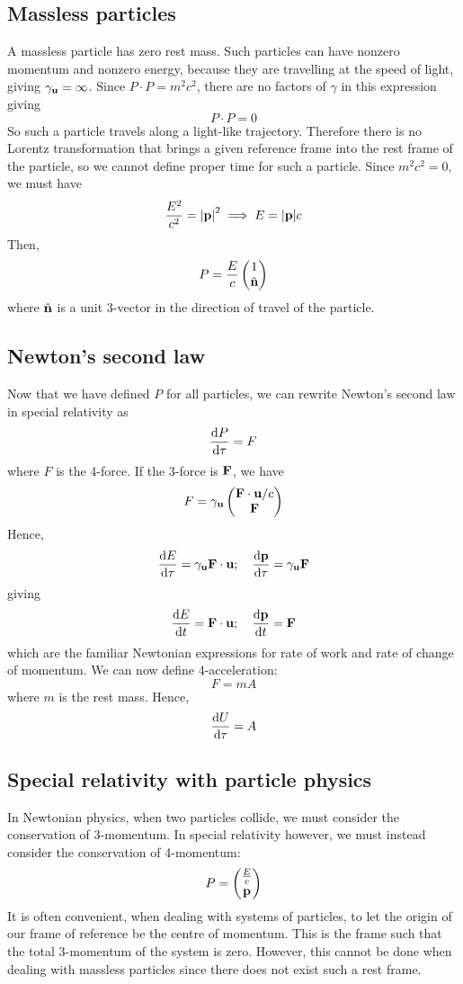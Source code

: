\subsection{Massless particles}
A massless particle has zero rest mass.
Such particles can have nonzero momentum and nonzero energy, because they are travelling at the speed of light, giving \(\gamma_{\vb u} = \infty\).
Since \(P \cdot P = m^2c^2\), there are no factors of \(\gamma\) in this expression giving
\[
	P \cdot P = 0
\]
So such a particle travels along a light-like trajectory.
Therefore there is no Lorentz transformation that brings a given reference frame into the rest frame of the particle, so we cannot define proper time for such a particle.
Since \(m^2c^2 = 0\), we must have
\[
	\frac{E^2}{c^2} = \abs{\vb p}^2 \implies E = \abs{\vb p}c
\]
Then,
\[
	P = \frac{E}{c} \begin{pmatrix}
		1 \\ \hat{\vb{n}}
	\end{pmatrix}
\]
where \(\hat{\vb{n}}\) is a unit 3-vector in the direction of travel of the particle.

\subsection{Newton's second law}
Now that we have defined \(P\) for all particles, we can rewrite Newton's second law in special relativity as
\[
	\dv{P}{\tau} = F
\]
where \(F\) is the 4-force.
If the 3-force is \(\vb F\), we have
\[
	F = \gamma_{\vb u} \begin{pmatrix}
		\vb F \cdot \vb u / c \\
		\vb F
	\end{pmatrix}
\]
Hence,
\[
	\dv{E}{\tau} = \gamma_{\vb u} \vb F \cdot \vb u;\quad \dv{\vb p}{\tau} = \gamma_{\vb u} \vb F
\]
giving
\[
	\dv{E}{t} = \vb F \cdot \vb u;\quad \dv{\vb p}{t} = \vb F
\]
which are the familiar Newtonian expressions for rate of work and rate of change of momentum.
We can now define 4-acceleration:
\[
	F = mA
\]
where \(m\) is the rest mass.
Hence,
\[
	\dv{U}{\tau} = A
\]

\subsection{Special relativity with particle physics}
In Newtonian physics, when two particles collide, we must consider the conservation of 3-momentum.
In special relativity however, we must instead consider the conservation of 4-momentum:
\[
	P = \begin{pmatrix}
		\frac{E}{c} \\ \vb p
	\end{pmatrix}
\]
It is often convenient, when dealing with systems of particles, to let the origin of our frame of reference be the centre of momentum.
This is the frame such that the total 3-momentum of the system is zero.
However, this cannot be done when dealing with massless particles since there does not exist such a rest frame.

